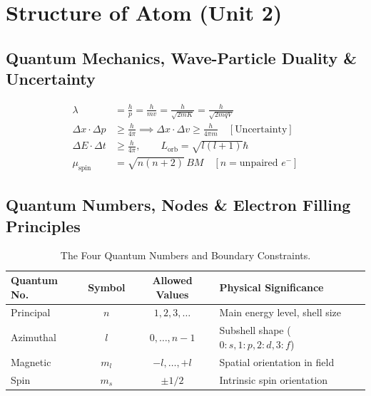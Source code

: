 \documentclass[10pt,twoside,openright]{book}
\begin{document}
\newpage

\section{Structure of Atom (Unit 2)}

\subsection{Quantum Mechanics, Wave-Particle Duality \& Uncertainty}

\begin{formulabox}
\begin{align}
  \lambda &= \frac{h}{p} = \frac{h}{mv} = \frac{h}{\sqrt{2mK}} = \frac{h}{\sqrt{2mqV}} \\
  \Delta x \cdot \Delta p &\ge \frac{h}{4\pi} \implies \Delta x \cdot \Delta v \ge \frac{h}{4\pi m} \quad [\text{Uncertainty}] \\
  \Delta E \cdot \Delta t &\ge \frac{h}{4\pi}, \qquad L_{\text{orb}} = \sqrt{l(l + 1)}\hbar \\
  \mu_{\text{spin}} &= \sqrt{n(n + 2)}\,\si{BM} \quad [n = \text{unpaired } e^-]
\end{align}
\end{formulabox}

\subsection{Quantum Numbers, Nodes \& Electron Filling Principles}

\begin{table}[htbp]
\centering
{\fontsize{7.5pt}{9.0pt}\selectfont\setlength{\tabcolsep}{1.5pt}
\begin{tabularx}{\linewidth}{l c c >{\RaggedRight}X}
\toprule
\textbf{Quantum No.} & \textbf{Symbol} & \textbf{Allowed Values} & \textbf{Physical Significance} \\
\midrule
Principal & $n$ & $1, 2, 3, \dots$ & Main energy level, shell size \\
Azimuthal & $l$ & $0, \dots, n-1$ & Subshell shape ($0:s, 1:p, 2:d, 3:f$) \\
Magnetic & $m_l$ & $-l, \dots, +l$ & Spatial orientation in field \\
Spin & $m_s$ & $\pm 1/2$ & Intrinsic spin orientation \\
\bottomrule
\end{tabularx}}
\caption{The Four Quantum Numbers and Boundary Constraints.}
\end{table}
\end{document}
